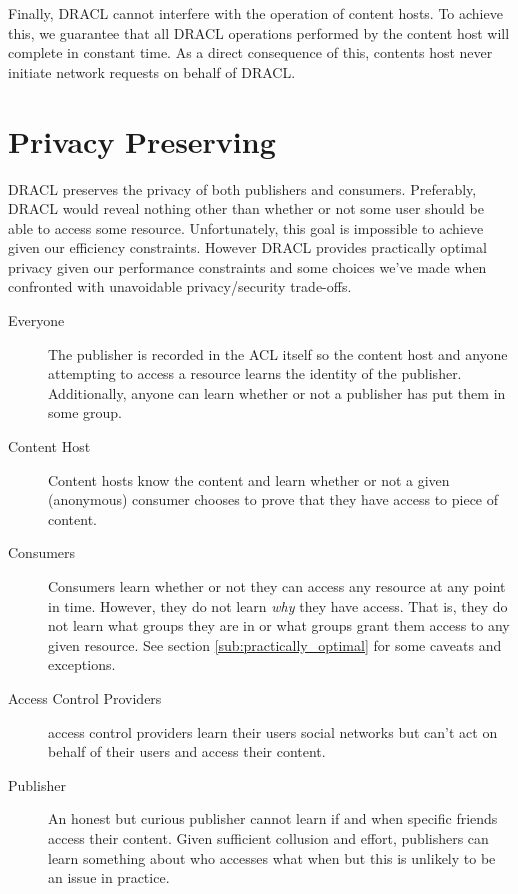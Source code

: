 \documentclass[pdftex,12pt,a4papaer]{report}
\begin{document}
Finally, DRACL cannot interfere with the operation of content hosts. To achieve
this, we guarantee that all DRACL operations performed by the content host will
complete in constant time. As a direct consequence of this, contents host never
initiate network requests on behalf of DRACL\@.

\section{Privacy Preserving}
\label{sec:privacy}

DRACL preserves the privacy of both publishers and consumers. Preferably,
DRACL would reveal nothing other than whether or not some user should be able to
access some resource. Unfortunately, this goal is impossible to achieve given
our efficiency constraints. However DRACL provides practically optimal privacy
given our performance constraints and some choices we've made when confronted
with unavoidable privacy/security trade-offs.

\begin{description}
\item[Everyone] The publisher is recorded in the ACL itself so the content
  host and anyone attempting to access a resource learns the identity of the
  publisher. Additionally, anyone can learn whether or not a publisher
  has put them in some group.
\item[Content Host] Content hosts know the content and learn whether or not a
  given (anonymous) consumer chooses to prove that they have access to piece of
  content.
\item[Consumers] Consumers learn whether or not they can access any resource at
  any point in time. However, they do not learn \emph{why} they have access.
  That is, they do not learn what groups they are in or what groups grant them
  access to any given resource. See section \ref{sub:practically_optimal} for some
  caveats and exceptions.
\item[Access Control Providers] access control providers learn their users
  social networks but can't act on behalf of their users and access their
  content.
\item[Publisher] An honest but curious publisher cannot learn if and
  when specific friends access their content. Given sufficient collusion and
  effort, publishers can learn something about who accesses what when but
  this is unlikely to be an issue in practice.
\end{description}
\end{document}
